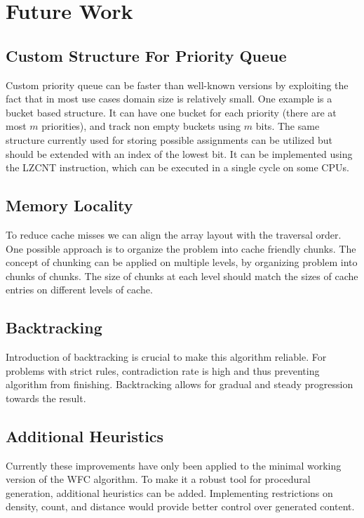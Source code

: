 \documentclass[shortabstract, english, inz]{iithesis}
\begin{document}
\chapter{Future Work}
\label{chapter6}
\section{Custom Structure For Priority Queue}
\label{prioritybuckets}
Custom priority queue can be faster than well-known versions by exploiting the fact that in most use cases domain size is relatively small. One example is a bucket based structure. It can have one bucket for each priority (there are at most \(m\) priorities), and track non empty buckets using \(m\) bits. The same structure currently used for storing possible assignments can be utilized but should be extended with an index of the lowest bit. It can be implemented using the LZCNT instruction, which can be executed in a single cycle on some CPUs.


\section{Memory Locality}
\label{chunks}
To reduce cache misses we can align the array layout with the traversal order. One possible approach is to organize the problem into cache friendly chunks. The concept of chunking can be applied on multiple levels, by organizing problem into chunks of chunks. The size of chunks at each level should match the sizes of cache entries on different levels of cache.


\section{Backtracking}
Introduction of backtracking is crucial to make this algorithm reliable. For problems with strict rules, contradiction rate is high and thus preventing algorithm from finishing. Backtracking allows for gradual and steady progression towards the result.


\section{Additional Heuristics}
Currently these improvements have only been applied to the minimal working version of the WFC algorithm. To make it a robust tool for procedural generation, additional heuristics can be added. Implementing restrictions on density, count, and distance would provide better control over generated content.
\end{document}
